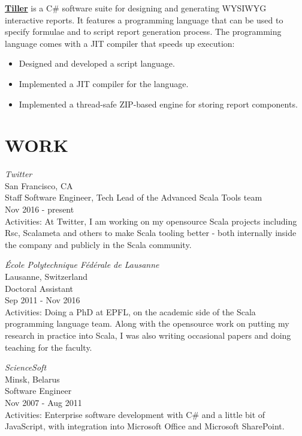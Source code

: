 \documentclass[margin, 10pt]{Stylesheet}
\begin{document}
\begin{resume}
\textbf{\href{http://code.google.com/p/elf4b/}{Tiller}} is a C\# software suite for designing and
generating WYSIWYG interactive reports. It features a programming language that can be used to
specify formulae and to script report generation process. The programming language comes with
a JIT compiler that speeds up execution:

\begin{itemize} \itemsep -2pt
\item Designed and developed a script language.
\item Implemented a JIT compiler for the language.
\item Implemented a thread-safe ZIP-based engine for storing report components.
\end{itemize}

\section{WORK}

\emph{Twitter}\\
San Francisco, CA \\
Staff Software Engineer, Tech Lead of the Advanced Scala Tools team \\
Nov 2016 - present\\
Activities: At Twitter, I am working on my opensource Scala projects including Rsc, Scalameta
and others to make Scala tooling better - both internally inside the company and publicly in the
Scala community.

\emph{\'{E}cole Polytechnique F\'{e}d\'{e}rale de Lausanne} \\
Lausanne, Switzerland \\
Doctoral Assistant \\
Sep 2011 - Nov 2016 \\
Activities: Doing a PhD at EPFL, on the academic side of the Scala programming language team.
Along with the opensource work on putting my research in practice into Scala, I was also writing
occasional papers and doing teaching for the faculty.

\emph{ScienceSoft} \\
Minsk, Belarus \\
Software Engineer \\
Nov 2007 - Aug 2011 \\
Activities: Enterprise software development with C\# and a little bit of JavaScript,
with integration into Microsoft Office and Microsoft SharePoint.


\end{resume}
\end{document}
